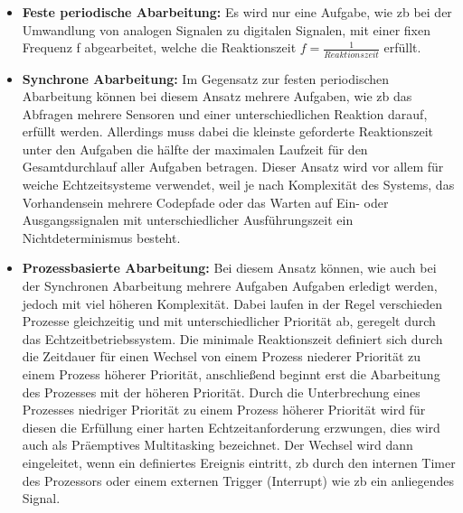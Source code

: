 \documentclass[../EDF Master Thesis.tex]{subfiles}
\begin{document}
    \begin{itemize}
        \item \textbf{Feste periodische Abarbeitung:} Es wird nur eine Aufgabe, wie \ac{zb} bei der Umwandlung von analogen Signalen zu digitalen Signalen, mit einer fixen Frequenz f abgearbeitet, welche die Reaktionszeit $ f = \frac{1}{Reaktionszeit}$ erfüllt.
        \item \textbf{Synchrone Abarbeitung:} Im Gegensatz zur festen periodischen Abarbeitung können bei diesem Ansatz mehrere Aufgaben, wie \ac{zb} das Abfragen mehrere Sensoren und einer unterschiedlichen Reaktion darauf, erfüllt werden.
            Allerdings muss dabei die kleinste geforderte Reaktionszeit unter den Aufgaben die hälfte der maximalen Laufzeit für den Gesamtdurchlauf aller Aufgaben betragen.
            Dieser Ansatz wird vor allem für weiche Echtzeitsysteme verwendet, weil je nach Komplexität des Systems, das Vorhandensein mehrere Codepfade oder das Warten auf Ein- oder Ausgangssignalen mit unterschiedlicher Ausführungszeit ein Nichtdeterminismus besteht.
        \item \textbf{Prozessbasierte Abarbeitung:} Bei diesem Ansatz können, wie auch bei der Synchronen Abarbeitung mehrere Aufgaben Aufgaben erledigt werden, jedoch mit viel höheren Komplexität.
            Dabei laufen in der Regel verschieden Prozesse gleichzeitig und mit unterschiedlicher Priorität ab, geregelt durch das Echtzeitbetriebssystem.
            Die minimale Reaktionszeit definiert sich durch die Zeitdauer für einen Wechsel von einem Prozess niederer Priorität zu einem Prozess höherer Priorität, anschließend beginnt erst die Abarbeitung des Prozesses mit der höheren Priorität.
            Durch die Unterbrechung eines Prozesses niedriger Priorität zu einem Prozess höherer Priorität wird für diesen die Erfüllung einer harten Echtzeitanforderung erzwungen, dies wird auch als Präemptives Multitasking bezeichnet.
            Der Wechsel wird dann eingeleitet, wenn ein definiertes Ereignis eintritt, \ac{zb} durch den internen Timer des Prozessors oder einem externen Trigger (Interrupt) wie \ac{zb} ein anliegendes Signal.
    \end{itemize}
    \parencite{wiki:001, echtzeit-grundlagen}
\end{document}

